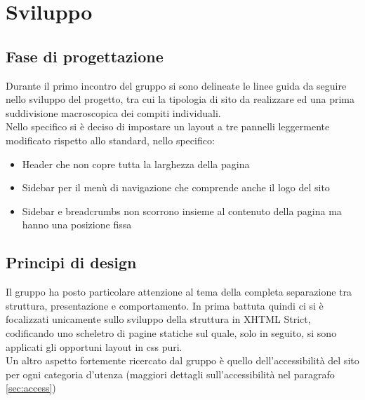 \section{Sviluppo}

\vspace{8px}

\subsection{Fase di progettazione}
Durante il primo incontro del gruppo si sono delineate le linee guida da seguire nello sviluppo del progetto, tra cui la tipologia di sito da realizzare ed una prima suddivisione macroscopica dei compiti individuali.\\
Nello specifico si è deciso di impostare un layout a tre pannelli leggermente modificato rispetto allo standard, nello specifico:
\begin{itemize}
 \item Header che non copre tutta la larghezza della pagina
 \item Sidebar per il menù di navigazione che comprende anche il logo del sito
 \item Sidebar e breadcrumbs non scorrono insieme al contenuto della pagina ma hanno una posizione fissa
\end{itemize}

\vspace{8px}

\subsection{Principi di design}
Il gruppo ha posto particolare attenzione al tema della completa separazione tra struttura, presentazione e comportamento. In prima battuta quindi ci si è focalizzati unicamente sullo sviluppo della struttura in XHTML Strict, codificando uno scheletro di pagine statiche sul quale, solo in seguito, si sono applicati gli opportuni layout in css puri.\\
Un altro aspetto fortemente ricercato dal gruppo è quello dell'accessibilità del sito per ogni categoria d'utenza (maggiori dettagli sull'accessibilità nel paragrafo \ref{sec:access})

\pagebreak

